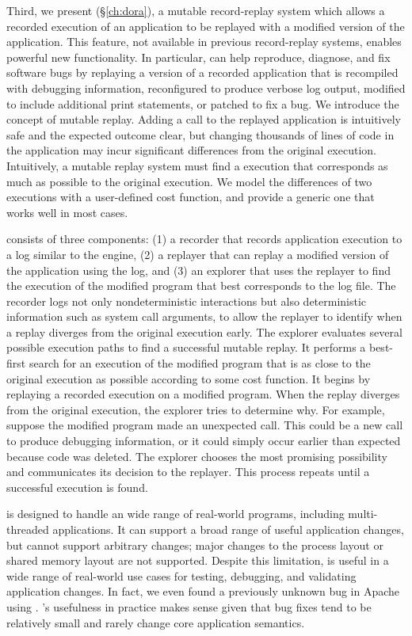 Third, we present \dora (\S\ref{ch:dora}), a mutable record-replay system which
allows a recorded execution of an application to be replayed with a modified
version of the application. This feature, not available in previous
record-replay systems, enables powerful new functionality. In particular, \dora
can help reproduce, diagnose, and fix software bugs by replaying a version of a
recorded application that is recompiled with debugging information, reconfigured
to produce verbose log output, modified to include additional print statements,
or patched to fix a bug.
We introduce the concept of mutable replay. Adding a  call
to the replayed application is intuitively safe and the expected outcome clear,
but changing thousands of lines of code in the application may incur significant
differences from the original execution. Intuitively, a mutable replay system
must find a execution that corresponds as much as possible to the original
execution. We model the differences of two executions with a user-defined cost
function, and provide a generic one that works well in most cases.

\dora consists of three components: (1) a recorder that records application
execution to a log similar to the \scribe engine, (2) a replayer that can replay
a modified version of the application using the log, and (3) an explorer that
uses the replayer to find the execution of the modified program that best
corresponds to the log file. The recorder logs not only nondeterministic
interactions but also deterministic information such as system call arguments,
to allow the replayer to identify when a replay diverges from the original
execution early.
The explorer evaluates several possible execution paths to find a successful
mutable replay. It performs a best-first search for an execution of
the modified program that is as close to the original execution as
possible according to some cost function. It begins by replaying a
recorded execution on a modified program. When the replay diverges
from the original execution, the explorer tries to determine
why. For example, suppose the modified program made an unexpected
 call. This could be a new call to produce debugging
information, or it could simply occur earlier than expected because
code was deleted. The explorer chooses the most promising possibility
and communicates its decision to the replayer. This process repeats
until a successful execution is found.

{\dora} is designed to handle an wide range of real-world programs, including
multi-threaded applications. It can support a broad range of useful application
changes, but cannot support arbitrary changes; major changes to the process
layout or shared memory layout are not supported. Despite this limitation,
{\dora} is useful in a wide range of real-world use cases for testing,
debugging, and validating application changes. In fact, we even found a
previously unknown bug in Apache using {\dora}. {\dora}'s usefulness in practice
makes sense given that bug fixes tend to be relatively small and rarely change
core application semantics.

